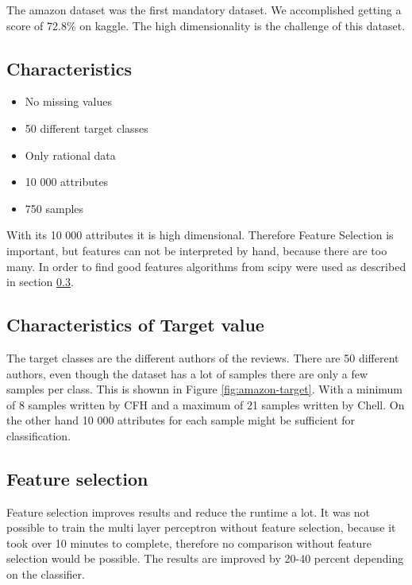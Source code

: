The amazon dataset was the first mandatory dataset. We accomplished getting a score of 72.8\% on kaggle. The high dimensionality is the challenge of this dataset.




\subsection{Characteristics}

\begin{itemize}
\item No missing values
\item 50 different target classes
\item Only rational data
\item 10 000 attributes
\item 750 samples
\end{itemize}

With its 10 000 attributes it is high dimensional. Therefore Feature Selection is important, but features can not be interpreted by hand, because there are too many. In order to find good features algorithms from scipy were used as described in section \ref{amazon-feature-selection}.

\subsection{Characteristics of Target value}
The target classes are the different authors of the reviews.
 There are 50 different authors, even though the dataset has a lot of samples there are only a few samples per class.
This is shownn in Figure \ref{fig:amazon-target}. With a minimum of 8 samples written by CFH and a maximum of 21 samples written by Chell. 
On the other hand 10 000 attributes for each sample might be sufficient for classification.




\subsection{Feature selection}
\label{amazon-feature-selection}
Feature selection improves results and reduce the runtime a lot. It was not possible to train the multi layer perceptron without feature selection, because it took over 10 minutes to complete, therefore no comparison without feature selection would be possible. The results are improved by 20-40 percent depending on the classifier. 

